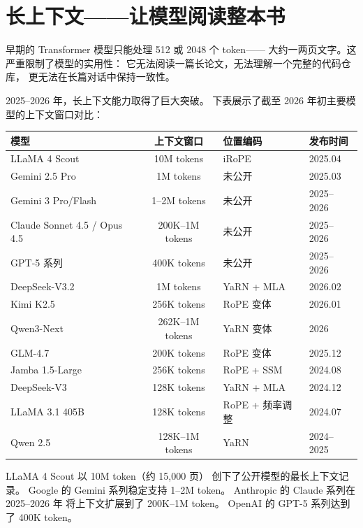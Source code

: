 \chapter{长上下文——让模型阅读整本书}
\label{ch:long-context}

早期的 Transformer 模型只能处理 512 或 2048 个 token——
大约一两页文字。这严重限制了模型的实用性：
它无法阅读一篇长论文，无法理解一个完整的代码仓库，
更无法在长篇对话中保持一致性。

2025--2026 年，长上下文能力取得了巨大突破。
下表展示了截至 2026 年初主要模型的上下文窗口对比：

\begin{center}
\begin{tabular}{lcll}
\hline
\textbf{模型} & \textbf{上下文窗口} & \textbf{位置编码} & \textbf{发布时间} \\
\hline
LLaMA 4 Scout     & 10M tokens  & iRoPE       & 2025.04 \\
Gemini 2.5 Pro    & 1M tokens   & 未公开       & 2025.03 \\
Gemini 3 Pro/Flash & 1--2M tokens & 未公开      & 2025--2026 \\
Claude Sonnet 4.5 / Opus 4.5 & 200K--1M tokens & 未公开 & 2025--2026 \\
GPT-5 系列        & 400K tokens & 未公开       & 2025--2026 \\
DeepSeek-V3.2     & 1M tokens   & YaRN + MLA   & 2026.02 \\
Kimi K2.5          & 256K tokens & RoPE 变体    & 2026.01 \\
Qwen3-Next        & 262K--1M tokens & YaRN 变体 & 2026 \\
GLM-4.7           & 200K tokens & RoPE 变体    & 2025.12 \\
Jamba 1.5-Large   & 256K tokens & RoPE + SSM   & 2024.08 \\
DeepSeek-V3       & 128K tokens & YaRN + MLA   & 2024.12 \\
LLaMA 3.1 405B    & 128K tokens & RoPE + 频率调整 & 2024.07 \\
Qwen 2.5          & 128K--1M tokens & YaRN    & 2024--2025 \\
\hline
\end{tabular}
\end{center}

LLaMA 4 Scout 以 10M token（约 15,000 页）
创下了公开模型的最长上下文记录。
Google 的 Gemini 系列稳定支持 1--2M token。
Anthropic 的 Claude 系列在 2025--2026 年
将上下文扩展到了 200K--1M token。
OpenAI 的 GPT-5 系列达到了 400K token。

